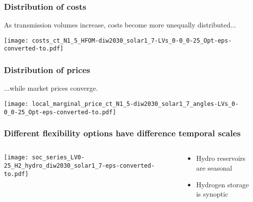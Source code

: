 \documentclass[10pt,aspectratio=169,dvipsnames]{beamer}
\let\olditem\item
\renewcommand{\item}{%
\olditem\vspace{5pt}}
\begin{document}
\begin{frame}
  \frametitle{Distribution of costs}

  As transmission volumes increase, costs become more unequally distributed...

  \centering
  \texttt{[image: costs\_ct\_N1\_5\_HFOM-diw2030\_solar1\_7-LVs\_0-0\_0-25\_Opt-eps-converted-to.pdf]}

\end{frame}


\begin{frame}
  \frametitle{Distribution of prices}

  ...while market prices converge.

  \centering

  \texttt{[image: local\_marginal\_price\_ct\_N1\_5-diw2030\_solar1\_7\_angles-LVs\_0-0\_0-25\_Opt-eps-converted-to.pdf]}

\end{frame}



\begin{frame}
  \frametitle{Different flexibility options have difference temporal scales}

\begin{columns}[T]
  \begin{column}{10.5cm}

    \vspace{0.5cm}
  \texttt{[image: soc\_series\_LV0-25\_H2\_hydro\_diw2030\_solar1\_7-eps-converted-to.pdf]}

  \end{column}

  \begin{column}{3cm}
    \vspace{1cm}
    \begin{itemize}
    \item Hydro reservoirs are \alert{seasonal}
    \item Hydrogen storage is \alert{synoptic}
    \end{itemize}

  \end{column}

\end{columns}
\end{frame}
\end{document}
